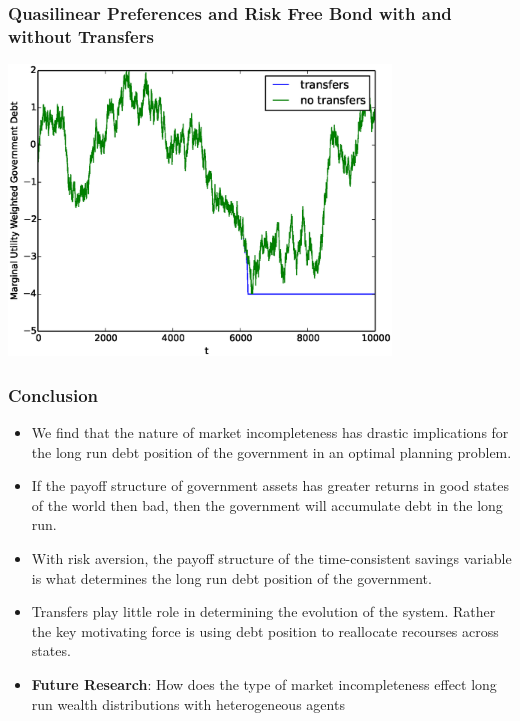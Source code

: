\documentclass{beamer}
\begin{document}
\begin{frame}
	\frametitle{Quasilinear Preferences and Risk Free Bond  with and without Transfers}
	\begin{center}
	\includegraphics[width=4in]{Images/transfer_example2.eps}
	\end{center}
\end{frame}

 \begin{frame}
  \frametitle{Conclusion}
\begin{itemize}
	\item We find that the nature of market incompleteness has drastic implications for the long run debt position of the government in an optimal planning problem.
	\item If the payoff structure of government assets has greater returns in good states of the world then bad, then the government will accumulate debt in the long run.
	\item  With risk aversion, the payoff structure of the time-consistent savings variable is what determines the long run debt position of the government.
	\item  Transfers play little role in determining the evolution of the system.  Rather the key motivating force is using debt position to reallocate recourses across states.
	\item  \textbf{Future Research}:  How does the type of market incompleteness effect long run wealth distributions with heterogeneous agents
\end{itemize}
 \end{frame}

 
\end{document}
